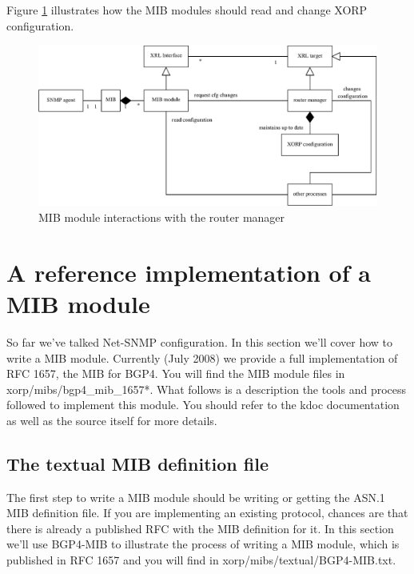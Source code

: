 \documentclass[11pt]{article}
\begin{document}
Figure \ref{fig:mib-class-diag} illustrates how the MIB modules should read and
change XORP configuration.

\begin{figure}
  \begin{center}
    \includegraphics[width=1\textwidth]{figs/snmp_fig1}
  \end{center}
  \caption{MIB module interactions with the router manager}
  \label{fig:mib-class-diag}
\end{figure}

\section{A reference implementation of a MIB module}

So far we've talked Net-SNMP configuration.  In this section we'll cover
how to write a MIB module.  Currently (July 2008) we provide a full
implementation of RFC 1657, the MIB for BGP4.  You will find the MIB module
files in xorp/mibs/bgp4\_mib\_1657*.  What follows is a description the tools
and process followed to implement this module.  You should refer to the
kdoc documentation as well as the source itself for more details.   

\subsection{The textual MIB definition file}

The first step to write a MIB module should be writing or getting the ASN.1 MIB
definition file.  If you are implementing an existing protocol, chances are
that there is already a published RFC with the MIB definition for it.  In this
section we'll use BGP4-MIB to illustrate the process of writing a MIB module,
which is published in RFC 1657 and you will find in
xorp/mibs/textual/BGP4-MIB.txt.
\end{document}
